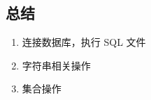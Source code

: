 \documentclass[aspectratio=169, 14pt]{beamer}
\begin{document}







    


\begin{frame}
    \section{\textcolor{darkmidnightblue}{总结}}   
    \begin{enumerate}
        \item 连接数据库，执行 SQL 文件
        \item 字符串相关操作
        \item 集合操作
    \end{enumerate}

\end{frame}
\end{document}
